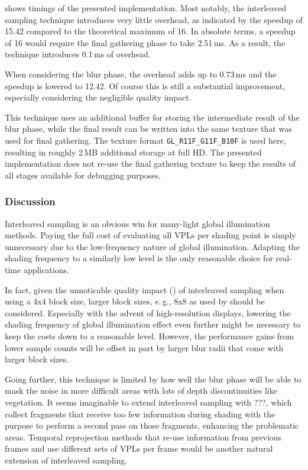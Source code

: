  shows timings of the presented implementation. Most notably, the interleaved sampling technique introduces very little overhead, as indicated by the speedup of 15.42 compared to the theoretical maximum of 16. In absolute terms, a speedup of 16 would require the final gathering phase to take 2.51\,ms. As a result, the technique introduces 0.1\,ms of overhead.

When considering the blur phase, the overhead adds up to 0.73\,ms and the speedup is lowered to 12.42. Of course this is still a substantial improvement, especially considering the negligible quality impact.

This technique uses an additional buffer for storing the intermediate result of the blur phase, while the final result can be written into the same texture that was used for final gathering. The texture format \texttt{GL\_R11F\_G11F\_B10F} is used here, resulting in roughly 2\,MB additional storage at full HD. The presented implementation does not re-use the final gathering texture to keep the results of all stages available for debugging purposes.


\subsubsection{Discussion}
Interleaved sampling is an obvious win for many-light global illumination methods. Paying the full cost of evaluating all VPLs per shading point is simply unnecessary due to the low-frequency nature of global illumination. Adapting the shading frequency to a similarly low level is the only reasonable choice for real-time applications.

In fact, given the unnoticable quality impact () of interleaved sampling when using a 4x4 block size, larger block sizes, e.\,g., 8x8 as used by \citet{hedman2016sequential} should be considered. Especially with the advent of high-resolution displays, lowering the shading frequency of global illumination effect even further might be necessary to keep the costs down to a reasonable level. However, the performance gains from lower sample counts will be offset in part by larger blur radii that come with larger block sizes.

Going further, this technique is limited by how well the blur phase will be able to mask the noise in more difficult areas with lots of depth discontinuities like vegetation. It seems imaginable to extend interleaved sampling with ???, which collect fragments that receive too few information during shading with the purpose to perform a second pass on those fragments, enhancing the problematic areas. Temporal reprojection methods that re-use information from previous frames and use different sets of VPLs per frame would be another natural extension of interleaved sampling.

